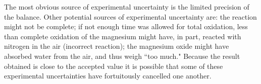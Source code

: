 \documentclass{article}
\begin{document}
The most obvious source of experimental uncertainty is the limited precision of the balance. Other potential sources of experimental uncertainty are: the reaction might not be complete; if not enough time was allowed for total oxidation, less than complete oxidation of the magnesium might have, in part, reacted with nitrogen in the air (incorrect reaction); the magnesium oxide might have absorbed water from the air, and thus weigh ``too much." Because the result obtained is close to the accepted value it is possible that some of these experimental uncertainties have fortuitously cancelled one another.






\end{document}
